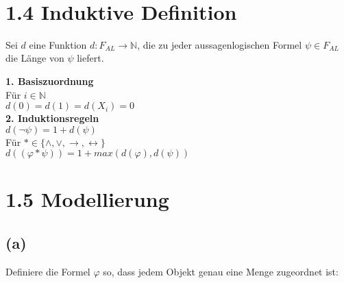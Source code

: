 

\printAuthor \\
\section*{1.4 Induktive Definition}
Sei $d$ eine Funktion $d: F_{AL} \rightarrow \mathbb{N}$, die zu jeder aussagenlogischen Formel $\psi \in F_{AL}$ die Länge von $\psi$ liefert.

\noindent
\textbf{1. Basiszuordnung}\\
Für $i \in \mathbb{N}$\\
$d(0) = d(1) = d(X_i) = 0$\\
\textbf{2. Induktionsregeln}\\
$d(\neg\psi) = 1 + d(\psi)$\\
Für $\ast \in \{\wedge, \vee, \rightarrow,\leftrightarrow \}$\\
$d((\varphi \ast \psi)) = 1 + max(d(\varphi), d(\psi))$

\section*{1.5 Modellierung}

\subsection*{(a)}
Definiere die Formel $\varphi$ so, dass jedem Objekt genau eine Menge zugeordnet ist:\\




